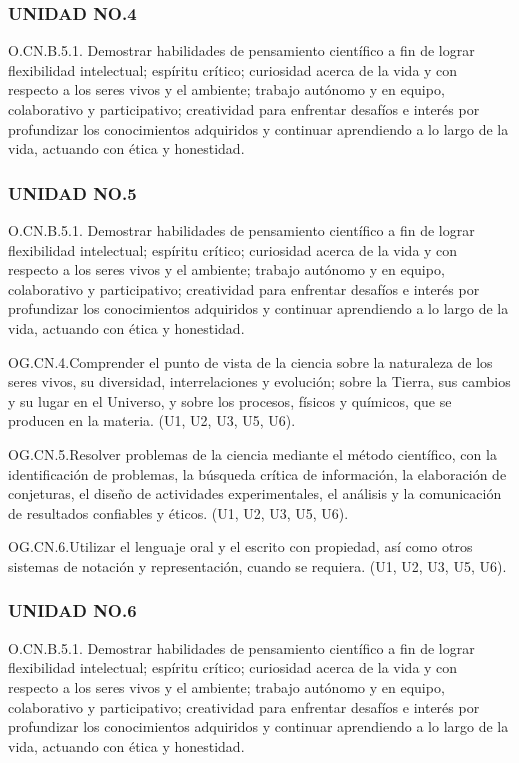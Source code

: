 \documentclass[a4paper, 12pt]{article}
\begin{document}
\subsubsection{UNIDAD NO.4}

O.CN.B.5.1. Demostrar habilidades de pensamiento científico a fin de lograr flexibilidad intelectual; espíritu crítico; curiosidad acerca de la vida y con respecto a los seres vivos y el ambiente; trabajo autónomo y en equipo, colaborativo y participativo; creatividad para enfrentar desafíos e interés por profundizar los conocimientos adquiridos y continuar aprendiendo a lo largo de la vida, actuando con ética y honestidad.

\subsubsection{UNIDAD NO.5}

O.CN.B.5.1. Demostrar habilidades de pensamiento científico a fin de lograr flexibilidad intelectual; espíritu crítico; curiosidad acerca de la vida y con respecto a los seres vivos y el ambiente; trabajo autónomo y en equipo, colaborativo y participativo; creatividad para enfrentar desafíos e interés por profundizar los conocimientos adquiridos y continuar aprendiendo a lo largo de la vida, actuando con ética y honestidad.

OG.CN.4.Comprender el punto de vista de la ciencia sobre la naturaleza de los seres vivos, su diversidad, interrelaciones y evolución; sobre la Tierra, sus cambios y su lugar en el Universo, y sobre los procesos, físicos y químicos, que se producen en la materia. (U1, U2, U3, U5, U6).

OG.CN.5.Resolver problemas de la ciencia mediante el método científico, con la identificación de problemas, la búsqueda crítica de información, la elaboración de conjeturas, el diseño de actividades experimentales, el análisis y la comunicación de resultados confiables y éticos. (U1, U2, U3, U5, U6).

OG.CN.6.Utilizar el lenguaje oral y el escrito con propiedad, así como otros sistemas de notación y representación, cuando se requiera. (U1, U2, U3, U5, U6).


\subsubsection{UNIDAD NO.6}

O.CN.B.5.1. Demostrar habilidades de pensamiento científico a fin de lograr flexibilidad intelectual; espíritu crítico; curiosidad acerca de la vida y con respecto a los seres vivos y el ambiente; trabajo autónomo y en equipo, colaborativo y participativo; creatividad para enfrentar desafíos e interés por profundizar los conocimientos adquiridos y continuar aprendiendo a lo largo de la vida, actuando con ética y honestidad.
\end{document}
